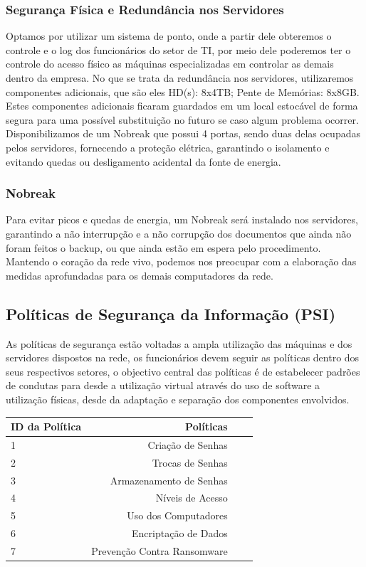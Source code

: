 \documentclass[12pt]{article}
\begin{document}
\subsubsection{Segurança Física e Redundância nos Servidores}
Optamos por utilizar um sistema de ponto, onde a partir dele obteremos o controle e o log dos funcionários do setor de TI, por meio dele poderemos ter o controle do acesso físico as máquinas especializadas em controlar as demais dentro da empresa. No que se trata da redundância nos servidores, utilizaremos componentes adicionais, que são eles HD(s): 8x4TB; Pente de Memórias: 8x8GB. Estes componentes adicionais ficaram guardados em um local estocável de forma segura para uma possível substituição no futuro se caso algum problema ocorrer. Disponibilizamos de um Nobreak que possui 4 portas, sendo duas delas ocupadas pelos servidores, fornecendo a proteção elétrica, garantindo o isolamento e evitando quedas ou desligamento acidental da fonte de energia.
\subsubsection{Nobreak}
Para evitar picos e quedas de energia, um Nobreak será instalado nos servidores, garantindo a não interrupção e a não corrupção dos documentos que ainda não foram feitos o backup, ou que ainda estão em espera pelo procedimento. Mantendo o coração da rede vivo, podemos nos preocupar com a elaboração das medidas aprofundadas para os demais computadores da rede.
\subsection{Políticas de Segurança da Informação (PSI)}
As políticas de segurança estão voltadas a ampla utilização das máquinas e dos servidores dispostos na rede, os funcionários devem seguir as políticas dentro dos seus respectivos setores, o objectivo central das políticas é de estabelecer padrões de condutas para desde a utilização virtual através do uso de software a utilização físicas, desde da adaptação e separação dos componentes envolvidos.
\begin{center}
\begin{tabular}{| l | r | r | r |}
\hline 
ID da Política & Políticas\\
\hline
1 & Criação de Senhas\\
2 & Trocas de Senhas\\
3 & Armazenamento de Senhas\\
4 & Níveis de Acesso\\
5 & Uso dos Computadores\\
6 & Encriptação de Dados\\
7 & Prevenção Contra Ransomware\\
\hline
\end{tabular}
\end{center}
\end{document}
